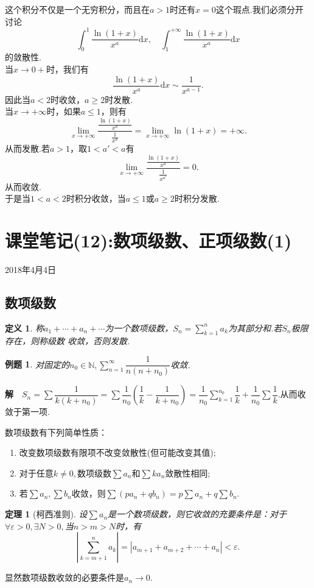\documentclass[UTF8]{article}
\newcommand{\dx}{\mathrm{d}x}
\newcommand{\jie}{\textbf{解}$\quad$}
\newtheorem{thm}{\hspace{2em}定理}[section]
\newtheorem{dfn}{\hspace{2em}定义}[section]
\newtheorem{exa}{\hspace{2em}例题}[section]
\begin{document}
这个积分不仅是一个无穷积分，而且在$a>1$时还有$x=0$这个瑕点.我们必须分开讨论
$$\int_0^1\dfrac{\ln(1+x)}{x^a}\dx,\quad \int_1^{+\infty}\dfrac{\ln(1+x)}{x^a}\dx$$的敛散性.\\
当$x\to0+$时，我们有
$$\dfrac{\ln(1+x)}{x^a}\dx\sim\frac{1}{x^{a-1}}.$$
因此当$a<2$时收敛，$a\ge2$时发散.\\
当$x\to+\infty$时，如果$a\le 1$，则有
$$\lim_{x\to+\infty}\frac{\frac{\ln(1+x)}{x^a}}{\frac{1}{x^a}}=\lim_{x\to+\infty}\ln(1+x)=+\infty.$$
从而发散.若$a>1$，取$1<a'<a$有
$$\lim_{x\to+\infty}\frac{\frac{\ln(1+x)}{x^a}}{\frac{1}{x^{a'}}}=0.$$
从而收敛.\\
于是当$1<a<2$时积分收敛，当$a\le1$或$a\ge2$时积分发散.
\clearpage
\section{课堂笔记(12):数项级数、正项级数(1)}
\begin{center}
  2018年4月4日
\end{center}
\subsection{数项级数}
\begin{dfn}
  称$a_1+\cdots+a_n+\cdots$为一个数项级数，$S_n=\sum\limits_{k=1}^na_k$为其部分和.若$S_n$极限存在，则称级数
  收敛，否则发散.
\end{dfn}
\begin{exa}
  对固定的$n_0\in\mathbb{N},\sum\limits_{n=1}^\infty\dfrac{1}{n(n+n_0)}$收敛.
\end{exa}
\jie $S_n=\sum\dfrac{1}{k(k+n_0)}=\sum\dfrac{1}{n_0}\left(\dfrac{1}{k}-\dfrac{1}{k+n_0}\right)=\dfrac{1}{n_0}
\sum\limits_{k=1}^{n_0}\dfrac{1}{k}+\dfrac{1}{n_0}\sum\dfrac{1}{k}.$从而收敛于第一项.

数项级数有下列简单性质：
\begin{enumerate}
  \item 改变数项级数有限项不改变敛散性(但可能改变其值);
  \item 对于任意$k\ne0,$数项级数$\sum a_n$和$\sum ka_n$敛散性相同;
  \item 若$\sum a_n,\sum b_n$收敛，则$\sum(pa_n+qb_n)=p\sum a_n+q\sum b_n.$
\end{enumerate}
\begin{thm}[柯西准则]
  设$\sum a_n$是一个数项级数，则它收敛的充要条件是：对于$\forall \varepsilon>0,\exists N>0,$当$n>m>N$时，有
  $$\left|\sum_{k=m+1}^na_k\right|=|a_{m+1}+a_{m+2}+\cdots+a_n|<\varepsilon.$$
\end{thm}
显然数项级数收敛的必要条件是$a_n\to0.$
\end{document}
